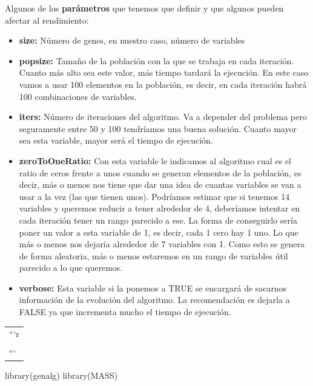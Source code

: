 \documentclass[
  a4paper,
  DIV=11,
  numbers=noendperiod]{scrreprt}
\newenvironment{Shaded}{\begin{snugshade}}{\end{snugshade}}
\newcommand{\FunctionTok}[1]{\textcolor[rgb]{0.00,0.00,0.00}{#1}}
\newcommand{\NormalTok}[1]{\textcolor[rgb]{0.00,0.00,0.00}{#1}}
\begin{document}
Algunos de los \textbf{parámetros} que tenemos que definir y que algunos
pueden afectar al rendimiento:

\begin{itemize}
\item
  \textbf{size:} Número de genes, en nuestro caso, número de variables
\item
  \textbf{popsize:} Tamaño de la población con la que se trabaja en cada
  iteración. Cuanto más alto sea este valor, más tiempo tardará la
  ejecución. En este caso vamos a usar 100 elementos en la población, es
  decir, en cada iteración habrá 100 combinaciones de variables.
\item
  \textbf{iters:} Número de iteraciones del algoritmo. Va a depender del
  problema pero seguramente entre 50 y 100 tendríamos una buena
  solución. Cuanto mayor sea esta variable, mayor será el tiempo de
  ejecución.
\item
  \textbf{zeroToOneRatio:} Con esta variable le indicamos al algoritmo
  cual es el ratio de ceros frente a unos cuando se generan elementos de
  la población, es decir, más o menos nos tiene que dar una idea de
  cuantas variables se van a usar a la vez (las que tienen unos).
  Podríamos estimar que si tenemos 14 variables y queremos reducir a
  tener alrededor de 4, deberíamos intentar en cada iteración tener un
  rango parecido a ese. La forma de conseguirlo sería poner un valor a
  esta variable de 1, es decir, cada 1 cero hay 1 uno. Lo que más o
  menos nos dejaría alrededor de 7 variables con 1. Como esto se genera
  de forma aleatoria, más o menos estaremos en un rango de variables
  útil parecido a lo que queremos.
\item
  \textbf{verbose:} Esta variable si la ponemos a TRUE se encargará de
  sacarnos información de la evolución del algoritmo. La recomendación
  es dejarla a FALSE ya que incrementa mucho el tiempo de ejecución.
\end{itemize}

\begin{longtable}[]{@{}l@{}}
\toprule\noalign{}
\endhead
\bottomrule\noalign{}
\endlastfoot
```r \\
 \\
``` \\
\end{longtable}

\begin{Shaded}
\begin{Highlighting}[numbers=left,,]
\FunctionTok{library}\NormalTok{(genalg) }\FunctionTok{library}\NormalTok{(MASS)}
\end{Highlighting}
\end{Shaded}
\end{document}
